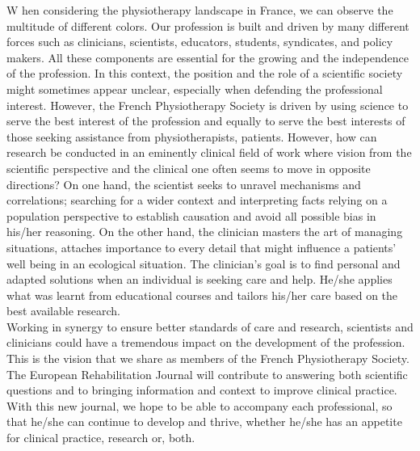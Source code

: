 \lettrine[lines=2]{\color{color2}W}{} hen considering the physiotherapy landscape in France, we can observe the multitude of different colors. Our profession is built and driven by many different forces such as clinicians, scientists, educators, students, syndicates, and policy makers. All these components are essential for the growing and the independence of the profession. In this context, the position and the role of a scientific society might sometimes appear unclear, especially when defending the professional interest. However, the French Physiotherapy Society is driven by using science to serve the best interest of the profession and equally to serve the best interests of those seeking assistance from physiotherapists, patients. However, how can research be conducted in an eminently clinical field of work where vision from the scientific perspective and the clinical one often seems to move in opposite directions? On one hand, the scientist seeks to unravel mechanisms and correlations; searching for a wider context and interpreting facts relying on a population perspective to establish causation and avoid all possible bias in his/her reasoning. On the other hand, the clinician masters the art of managing situations, attaches importance to every detail that might influence a patients’ well being in an ecological situation. The clinician’s goal is to find personal and adapted solutions when an individual is seeking care and help. He/she applies what was learnt from educational courses and tailors his/her care based on the best available research. \\


Working in synergy to ensure better standards of care and research, scientists and clinicians could have a tremendous impact on the development of the profession. This is the vision that we share as members of the French Physiotherapy Society. The European Rehabilitation Journal will contribute to answering both scientific questions and to bringing information and context to improve clinical practice. With this new journal, we hope to be able to accompany each professional, so that he/she can continue to develop and thrive, whether he/she has an appetite for clinical practice, research or, both.\\ 

